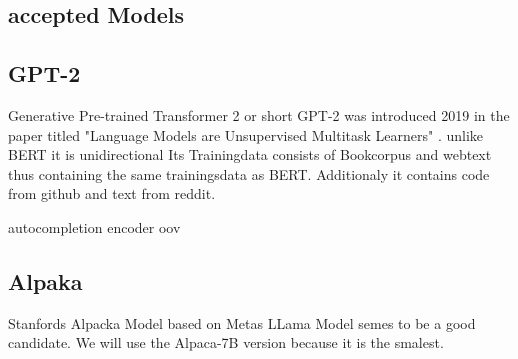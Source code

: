\subsection{accepted Models}

\subsection{GPT-2}
 Generative Pre-trained Transformer 2 or short GPT-2 was introduced 2019 in the paper titled "Language Models are Unsupervised Multitask Learners"\cite{Radford2019LanguageMA}  . unlike BERT it is unidirectional
Its Trainingdata consists of Bookcorpus and webtext thus containing the same trainingsdata as BERT. Additionaly it contains code from github and text from reddit.

 autocompletion 
 encoder
 oov





\subsection{Alpaka} 
Stanfords Alpacka Model based on Metas LLama Model semes to be a good candidate.
We will use the Alpaca-7B version because it is the smalest. 








